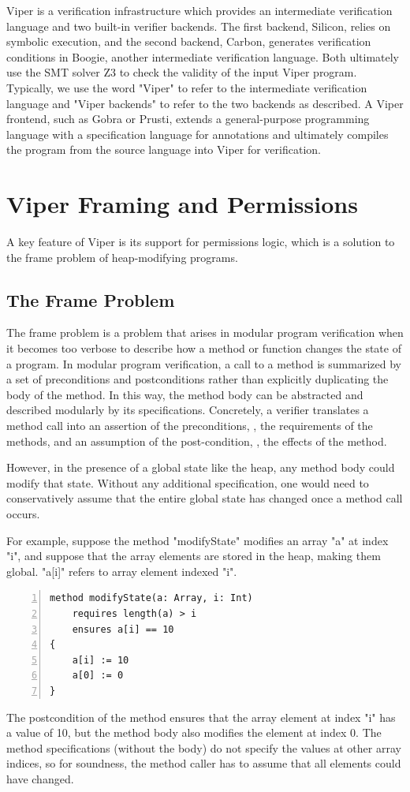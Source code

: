 \documentclass[msc,oneside]{ubcthesis}
\begin{document}
Viper is a verification infrastructure which provides an intermediate verification language and two built-in verifier backends. The first backend, Silicon, relies on symbolic execution, and the second backend, Carbon, generates verification conditions in Boogie, another intermediate verification language. Both ultimately use the SMT solver Z3 to check the validity of the input Viper program. Typically, we use the word "Viper" to refer to the intermediate verification language and "Viper backends" to refer to the two backends as described. A Viper frontend, such as Gobra or Prusti, extends a general-purpose programming language with a specification language for annotations and ultimately compiles the program from the source language into Viper for verification. 

\section{Viper Framing and Permissions}
A key feature of Viper is its support for permissions logic, which is a solution to the frame problem of heap-modifying programs.

\subsection{The Frame Problem}
The frame problem is a problem that arises in modular program verification when it becomes too verbose to describe how a method or function changes the state of a program. In modular program verification, a call to a method is summarized by a set of preconditions and postconditions rather than explicitly duplicating the body of the method. In this way, the method body can be abstracted and described modularly by its specifications.  Concretely, a verifier translates a method call into an assertion of the preconditions, \ie, the requirements of the methods, and an assumption of the post-condition, \ie, the effects of the method. 

However, in the presence of a global state like the heap, any method body could modify that state. Without any additional specification, one would need to conservatively assume that the entire global state has changed once a method call occurs. 

For example, suppose the method "modifyState" modifies an array "a" at index "i", and suppose that the array elements are stored in the heap, making them global. "a[i]" refers to array element indexed "i".
\begin{lstlisting}[language=silver,numbers=left, firstnumber=1, stepnumber=1]
method modifyState(a: Array, i: Int)
    requires length(a) > i
    ensures a[i] == 10
{
    a[i] := 10
    a[0] := 0
}
\end{lstlisting}
The postcondition of the method ensures that the array element at index "i" has a value of 10, but the method body also modifies the element at index 0. The method specifications (without the body) do not specify the values at other array indices, so for soundness, the method caller has to assume that all elements could have changed.
\end{document}
